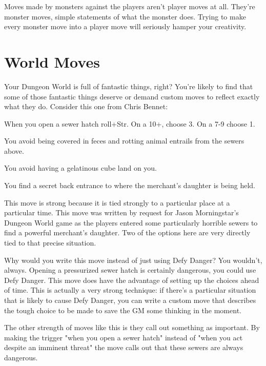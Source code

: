 

Moves made by monsters against the players aren't player moves at all. They're monster moves, simple statements of what the monster does. Trying to make every monster move into a player move will seriously hamper your creativity.

 
\section{World Moves}    
 

Your Dungeon World is full of fantastic things, right? You're likely to find that some of those fantastic things deserve or demand custom moves to reflect exactly what they do. Consider this one from Chris Bennet:

 
\startExample
When you open a sewer hatch roll+Str. On a 10+, choose 3. On a 7-9 choose 1.
\stopExample
 
\startitemize[1,packed]

\item You avoid being covered in feces and rotting animal entrails from the sewers above.

 
\item You avoid having a gelatinous cube land on you.

 
\item You find a secret back entrance to where the merchant's daughter is being held.


\stopitemize
 

This move is strong because it is tied strongly to a particular place at a particular time. This move was written by request for Jason Morningstar's Dungeon World game as the players entered some particularly horrible sewers to find a powerful merchant's daughter. Two of the options here are very directly tied to that precise situation.

 

Why would you write this move instead of just using Defy Danger? You wouldn't, always. Opening a pressurized sewer hatch is certainly dangerous, you could use Defy Danger. This move does have the advantage of setting up the choices ahead of time. This is actually a very strong technique: if there's a particular situation that is likely to cause Defy Danger, you can write a custom move that describes the tough choice to be made to save the GM some thinking in the moment.

 

The other strength of moves like this is they call out something as important. By making the trigger "when you open a sewer hatch" instead of "when you act despite an imminent threat" the move calls out that these sewers are always dangerous.


